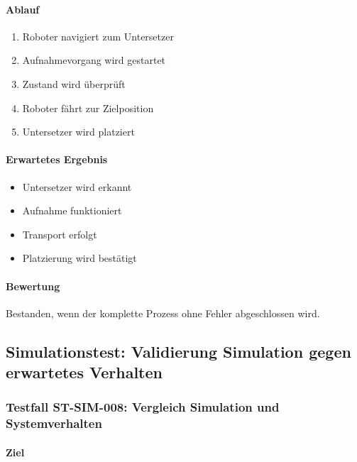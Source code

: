 \paragraph{Ablauf}\label{ablauf-22}

\begin{enumerate}
\def\labelenumi{\arabic{enumi}.}
\tightlist
\item
  Roboter navigiert zum Untersetzer
\item
  Aufnahmevorgang wird gestartet
\item
  Zustand wird überprüft
\item
  Roboter fährt zur Zielposition
\item
  Untersetzer wird platziert
\end{enumerate}

\paragraph{Erwartetes Ergebnis}\label{erwartetes-ergebnis-22}

\begin{itemize}
\tightlist
\item
  Untersetzer wird erkannt
\item
  Aufnahme funktioniert
\item
  Transport erfolgt
\item
  Platzierung wird bestätigt
\end{itemize}

\paragraph{Bewertung}\label{bewertung-22}

Bestanden, wenn der komplette Prozess ohne Fehler abgeschlossen wird.

\subsection{Simulationstest: Validierung Simulation gegen erwartetes
Verhalten}\label{simulationstest-validierung-simulation-gegen-erwartetes-verhalten}

\subsubsection{Testfall ST-SIM-008: Vergleich Simulation und
Systemverhalten}\label{testfall-st-sim-008-vergleich-simulation-und-systemverhalten}

\paragraph{Ziel}\label{ziel-23}


